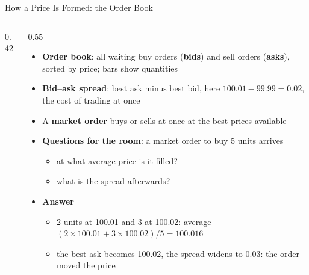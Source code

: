 \begin{frame}{How a Price Is Formed: the Order Book}
\itemsize{\footnotesize}
\begin{columns}[T]
\begin{column}{0.42\textwidth}
\centering
{}
\end{column}
\begin{column}{0.55\textwidth}
\begin{itemize}
    \item \textbf{Order book}: all waiting buy orders (\textbf{bids}) and sell orders (\textbf{asks}), sorted by price; bars show quantities
    \item \textbf{Bid--ask spread}: best ask minus best bid, here $100.01 - 99.99 = 0.02$, the cost of trading at once
    \item A \textbf{market order} buys or sells at once at the best prices available
    \item \textbf{Questions for the room}: a market order to buy 5 units arrives
    \begin{itemize}
        \item at what average price is it filled?
        \item what is the spread afterwards?
    \end{itemize}
    \pause
    \item \textbf{Answer}
    \begin{itemize}
        \item 2 units at 100.01 and 3 at 100.02: average $(2 \times 100.01 + 3 \times 100.02)/5 = 100.016$
        \item the best ask becomes 100.02, the spread widens to 0.03: the order moved the price
    \end{itemize}
\end{itemize}
\end{column}
\end{columns}
\end{frame}


